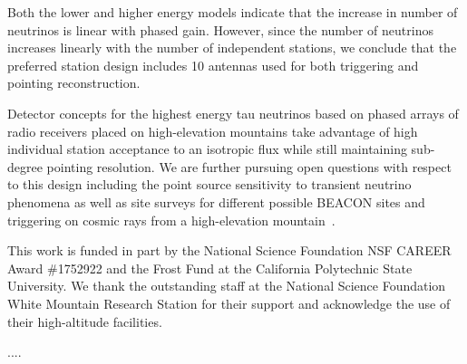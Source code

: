 \documentclass{PoS}
\begin{document}
Both the lower and higher energy models indicate that the increase in number of neutrinos is linear with phased gain. However, since the number of neutrinos increases linearly with the number of independent stations, we conclude that the preferred station design includes 10 antennas used for both triggering and pointing reconstruction. 

Detector concepts for the highest energy tau neutrinos based on phased arrays of radio receivers placed on high-elevation mountains take advantage of high individual station acceptance to an isotropic flux while still maintaining sub-degree pointing resolution. We are further pursuing open questions with respect to this design including the point source sensitivity to transient neutrino phenomena as well as site surveys for different possible BEACON sites and triggering on cosmic rays from a high-elevation mountain~\cite{ICRC_BEACON_prototype}.

This work is funded in part by the National Science Foundation NSF CAREER Award \#1752922 and the Frost Fund at the California Polytechnic State University. We thank the outstanding staff at the National Science Foundation White Mountain Research Station for their support and acknowledge the use of their high-altitude facilities.

\begin{thebibliography}{99}
....






\end{thebibliography}
\end{document}
